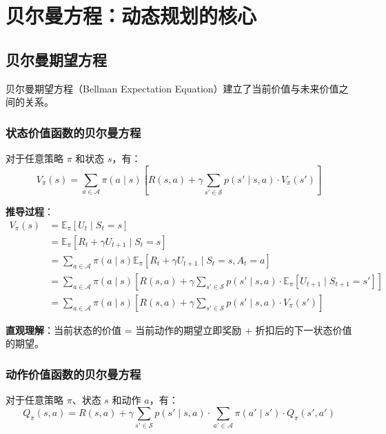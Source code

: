 \section{贝尔曼方程：动态规划的核心}

\subsection{贝尔曼期望方程}

贝尔曼期望方程（Bellman Expectation Equation）建立了当前价值与未来价值之间的关系。

\subsubsection{状态价值函数的贝尔曼方程}
\begin{theorem}[状态价值函数的贝尔曼方程]
对于任意策略 $\pi$ 和状态 $s$，有：
\[
V_\pi(s) = \sum_{a \in \mathcal{A}} \pi(a \mid s) \left[ R(s, a) + \gamma \sum_{s' \in \mathcal{S}} p(s' \mid s, a) \cdot V_\pi(s') \right]
\]
\end{theorem}

\textbf{推导过程}：
\begin{align*}
V_\pi(s) &= \mathbb{E}_\pi[U_t \mid S_t = s] \\
&= \mathbb{E}_\pi\left[R_t + \gamma U_{t+1} \mid S_t = s\right] \\
&= \sum_{a \in \mathcal{A}} \pi(a \mid s) \mathbb{E}_\pi\left[R_t + \gamma U_{t+1} \mid S_t = s, A_t = a\right] \\
&= \sum_{a \in \mathcal{A}} \pi(a \mid s) \left[ R(s, a) + \gamma \sum_{s' \in \mathcal{S}} p(s' \mid s, a) \cdot \mathbb{E}_\pi[U_{t+1} \mid S_{t+1} = s'] \right] \\
&= \sum_{a \in \mathcal{A}} \pi(a \mid s) \left[ R(s, a) + \gamma \sum_{s' \in \mathcal{S}} p(s' \mid s, a) \cdot V_\pi(s') \right]
\end{align*}

\textbf{直观理解}：当前状态的价值 = 当前动作的期望立即奖励 + 折扣后的下一状态价值的期望。

\subsubsection{动作价值函数的贝尔曼方程}
\begin{theorem}[动作价值函数的贝尔曼方程]
对于任意策略 $\pi$、状态 $s$ 和动作 $a$，有：
\[
Q_\pi(s, a) = R(s, a) + \gamma \sum_{s' \in \mathcal{S}} p(s' \mid s, a) \cdot \sum_{a' \in \mathcal{A}} \pi(a' \mid s') \cdot Q_\pi(s', a')
\]
\end{theorem}

